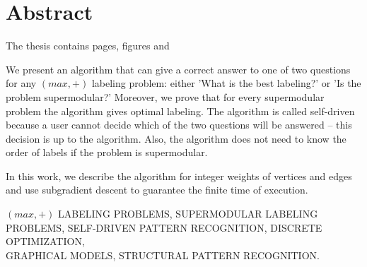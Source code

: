 \chapter*{Abstract}

The thesis contains 
pages,
figures
and 

We present an algorithm that can give a correct answer
to one of two questions for any \((max,+)\)
labeling problem: either 'What is the best labeling?' or 
'Is the problem supermodular?'
Moreover, we prove that for every supermodular problem
the algorithm gives optimal labeling. 
The algorithm is called self-driven because a user 
cannot decide which of the two questions will be answered
– this decision is up to the algorithm.\linebreak
Also, the algorithm
does not need to know the order of labels if the problem is supermodular.

In this work, we describe the algorithm for integer weights of vertices
and edges and use subgradient descent
to guarantee the finite time of execution.

\MakeUppercase{\((max,+)\) labeling problems, supermodular labeling\\ problems, self-driven pattern
recognition, discrete optimization,\\ graphical models, structural pattern recognition.}

